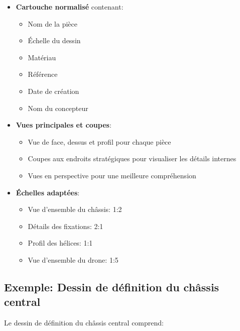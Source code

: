 \documentclass[a4paper,12pt]{report}
\begin{document}
\begin{itemize}
    \item \textbf{Cartouche normalisé} contenant:
    \begin{itemize}
        \item Nom de la pièce
        \item Échelle du dessin
        \item Matériau
        \item Référence
        \item Date de création
        \item Nom du concepteur
    \end{itemize}
    
    \item \textbf{Vues principales et coupes}:
    \begin{itemize}
        \item Vue de face, dessus et profil pour chaque pièce
        \item Coupes aux endroits stratégiques pour visualiser les détails internes
        \item Vues en perspective pour une meilleure compréhension
    \end{itemize}
    
    \item \textbf{Échelles adaptées}:
    \begin{itemize}
        \item Vue d'ensemble du châssis: 1:2
        \item Détails des fixations: 2:1
        \item Profil des hélices: 1:1
        \item Vue d'ensemble du drone: 1:5
    \end{itemize}
\end{itemize}

\subsection{Exemple: Dessin de définition du châssis central}
Le dessin de définition du châssis central comprend:
\end{document}
